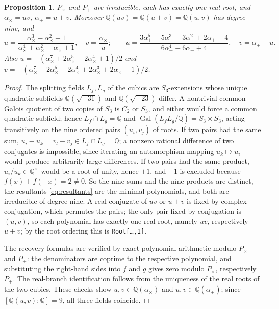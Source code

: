 \documentclass[11pt,a4paper]{article}
\newtheorem{proposition}[theorem]{Proposition}
\theoremstyle{definition}
\theoremstyle{remark}
\newcommand{\Q}{\mathbb{Q}}
\newcommand{\Gal}{\operatorname{Gal}}
\newcommand{\code}[1]{\texttt{#1}}
\begin{document}
\begin{proposition}\label{prop:examples}
$P_\times$ and $P_+$ are irreducible, each has exactly one real root, and $\alpha_\times=uv$,
$\alpha_+=u+v$.  Moreover $\Q(uv)=\Q(u+v)=\Q(u,v)$ has degree nine, and
\begin{equation}\label{eq:recover}
 u=\frac{\alpha_\times^3-\alpha_\times^2-1}{\alpha_\times^4+\alpha_\times^2-\alpha_\times+1},\quad
 v=\frac{\alpha_\times}{u};\qquad
 u=\frac{3\alpha_+^5-5\alpha_+^3-3\alpha_+^2+2\alpha_+-4}{6\alpha_+^4-6\alpha_++4},\quad v=\alpha_+-u.
\end{equation}
Also $u=-(\alpha_\times^7+2\alpha_\times^5-2\alpha_\times^4+1)/2$ and
$v=-(\alpha_\times^7+2\alpha_\times^5-2\alpha_\times^4+2\alpha_\times^3+2\alpha_\times-1)/2$.
\end{proposition}

\begin{proof}
The splitting fields $L_f,L_g$ of the cubics are $S_3$-extensions whose unique quadratic subfields
$\Q(\sqrt{-31})$ and $\Q(\sqrt{-23})$ differ.  A nontrivial common Galois quotient of two copies of
$S_3$ is $C_2$ or $S_3$, and either would force a common quadratic subfield; hence $L_f\cap L_g=\Q$ and
$\Gal(L_fL_g/\Q)=S_3\times S_3$, acting transitively on the nine ordered pairs $(u_i,v_j)$ of roots.
If two pairs had the same sum, $u_i-u_k=v_l-v_j\in L_f\cap L_g=\Q$; a nonzero rational difference of
two conjugates is impossible, since iterating an automorphism mapping $u_k\mapsto u_i$ would produce
arbitrarily large differences.  If two pairs had the same product, $u_i/u_k\in\Q^\times$ would be a root
of unity, hence $\pm1$, and $-1$ is excluded because $f(x)+f(-x)=2\ne0$.  So the nine sums and the nine
products are distinct, the resultants \eqref{eq:resultants} are the minimal polynomials, and both are
irreducible of degree nine.  A real conjugate of $uv$ or $u+v$ is fixed by complex conjugation, which
permutes the pairs; the only pair fixed by conjugation is $(u,v)$, so each polynomial has exactly one
real root, namely $uv$, respectively $u+v$; by the root ordering this is \code{Root[\ldots,1]}.

The recovery formulas are verified by exact polynomial arithmetic modulo $P_\times$ and $P_+$: the
denominators are coprime to the respective polynomial, and substituting the right-hand sides into
$f$ and $g$ gives zero modulo $P_\times$, respectively $P_+$.  The real-branch identification follows
from the uniqueness of the real roots of the two cubics.  These checks show $u,v\in\Q(\alpha_\times)$ and
$u,v\in\Q(\alpha_+)$; since $[\Q(u,v):\Q]=9$, all three fields coincide.
\end{proof}
\end{document}
